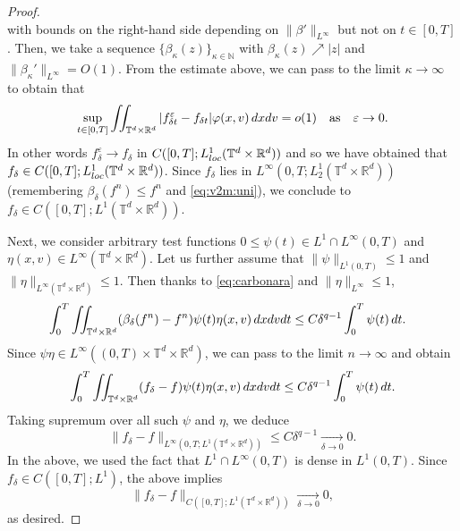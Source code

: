 \documentclass[11pt,reqno,a4paper]{amsart}
\newcommand{\R}{\mathbb{R}}
\newcommand{\ve}{\varepsilon}
\newcommand{\iinttr}{\iint_{\T^d\times\R^d}}
\theoremstyle{definition}
\theoremstyle{remark}
\numberwithin{equation}{section}
\newcommand{\T} {\mathbb T}
\newcommand{\bbN}{\mathbb N}
\newcommand{\dx}{\textnormal{d}x}
\newcommand{\dv}{\textnormal{d}v}
\newcommand{\dt}{\textnormal{d}t}
\begin{document}
\begin{proof}
\begin{equation*}
    \end{equation*}
    with bounds on the right-hand side depending on $\|\beta'\|_{L^\infty}$ but not on $t\in [0,T]$.
    Then, we take a sequence $\{\beta_\kappa(z)\}_{\kappa\in \bbN}$ with $\beta_\kappa(z) \nearrow |z|$ and $\|\beta_\kappa'\|_{L^\infty} = O(1)$. From the estimate above, we can pass to the limit $\kappa\to\infty$ to obtain that
    \begin{equation*}
        \sup_{t\in [0,T]} \iinttr |f_{\delta t}^\ve - f_{\delta t}| \varphi(x,v) \,\dx\dv = o(1) \quad \text{as} \quad \ve \to 0.
    \end{equation*}
    In other words $f_{\delta}^\ve \to f_{\delta}$ in $C([0,T];L^1_{\rm loc}(\T^d\times\R^d))$ and so we have obtained that $f_\delta \in C([0,T];L^1_{\rm loc}(\T^d\times\R^d))$. Since $f_\delta$ lies in $L^\infty(0,T;L^1_2(\T^d\times\R^d))$ (remembering $\beta_\delta(f^n)\le f^n$ and \eqref{eq:v2m:uni}), we conclude to $f_\delta\in C([0,T];L^1(\T^d\times\R^d))$. 
    

    Next, we consider arbitrary test functions $0\le \psi(t)\in L^1\cap L^\infty(0,T)$ and $\eta(x,v)\in L^\infty(\T^d\times\R^d)$. Let us further assume that $\|\psi\|_{L^1(0,T)}\le 1$ and $\|\eta\|_{L^\infty(\T^d\times\R^d)}\le 1$. Then thanks to \eqref{eq:carbonara} and $\|\eta\|_{L^\infty}\le 1$,
    \begin{align*}
        &\int_0^T \iinttr (\beta_\delta(f^n) - f^n) \psi(t) \eta(x,v) \,\dx\dv\dt \le C \delta^{q-1} \int_0^T \psi(t)\,\dt.
    \end{align*}
    Since $\psi\eta \in L^\infty((0,T)\times\T^d\times\R^d)$, we can pass to the limit $n\to\infty$ and obtain
    \begin{equation*}
        \int_0^T \iinttr (f_\delta - f) \psi(t) \eta(x,v) \,\dx\dv\dt \le C\delta^{q-1} \int_0^T \psi(t) \,\dt. 
    \end{equation*}
    Taking supremum over all such $\psi$ and $\eta$, we deduce
    \begin{equation*}
        \|f_\delta - f\|_{L^\infty(0,T;L^1(\T^d\times\R^d))} \le C\delta^{q-1} \xrightarrow[\delta\to 0]{} 0.
    \end{equation*}
    In the above, we used the fact that $L^1\cap L^\infty(0,T)$ is dense in $L^1(0,T)$. Since $f_\delta \in C([0,T];L^1)$, the above implies
    \begin{equation*}
        \|f_\delta - f\|_{C([0,T];L^1(\T^d\times\R^d))} \xrightarrow[\delta\to 0]{} 0,
    \end{equation*}
    as desired.
\end{proof}
\end{document}
